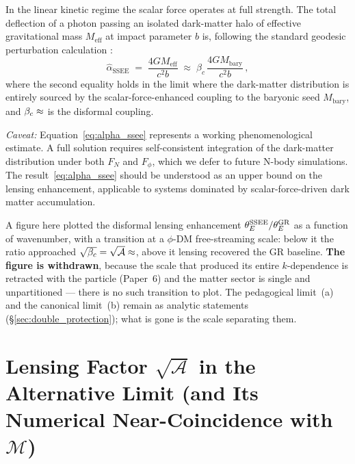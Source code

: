 \documentclass[12pt,a4paper]{article}
\newcommand{\MIRA}{\mathcal{M}}
\newcommand{\AURA}{\mathcal{A}}
\newcommand{\bc}{\beta_c}
\newcommand{\hatalf}{\hat{\alpha}}
\begin{document}
In the linear kinetic regime the scalar force operates at full strength.
The total deflection of a photon passing an isolated dark-matter halo of
effective gravitational mass $M_{\mathrm{eff}}$ at impact parameter $b$
is, following the standard geodesic perturbation calculation
\citep{will1993,bartelmann2001}:
\begin{equation}
  \hatalf_{\mathrm{SSEE}} \;=\; \frac{4GM_{\mathrm{eff}}}{c^2 b}
                           \;\approx\; \bc\,\frac{4GM_{\mathrm{bary}}}{c^2 b}\,,
  \label{eq:alpha_ssee}
\end{equation}
where the second equality holds in the limit where the dark-matter
distribution is entirely sourced by the scalar-force-enhanced coupling to
the baryonic seed $M_{\mathrm{bary}}$, and $\bc \approx \val{AURA_d3}$ is the
disformal coupling.

\textit{Caveat:} Equation~\eqref{eq:alpha_ssee} represents a working
phenomenological estimate.
A full solution requires self-consistent integration of the dark-matter
distribution under both $F_N$ and $F_\phi$, which we defer to future
N-body simulations.
The result~\eqref{eq:alpha_ssee} should be understood as an upper bound on
the lensing enhancement, applicable to systems dominated by scalar-force-driven
dark matter accumulation.

\begin{tcolorbox}[colback=orange!5,colframe=orange!60!black,title=Figure withdrawn]
A figure here plotted the disformal lensing enhancement
$\theta_E^{\rm SSEE}/\theta_E^{\rm GR}$ as a function of wavenumber, with a
transition at a $\phi$-DM free-streaming scale: below it the ratio approached
$\sqrt{\bc}=\sqrt{\mathcal{A}}\approx\val{sqrt_AURA_d4}$, above it lensing recovered the GR
baseline. \textbf{The figure is withdrawn}, because the scale that produced its
entire $k$-dependence is retracted with the particle (Paper~6) and the matter
sector is single and unpartitioned --- there is no such transition to plot. The
pedagogical limit~(a) and the canonical limit~(b) remain as analytic statements
(\S\ref{sec:double_protection}); what is gone is the scale separating them.
\end{tcolorbox}

\section{Lensing Factor \texorpdfstring{$\sqrt{\AURA}$}{sqrt(AURA)} in the Alternative Limit
         (and Its Numerical Near-Coincidence with \texorpdfstring{$\MIRA$}{M})}
\label{sec:mira}
\end{document}
